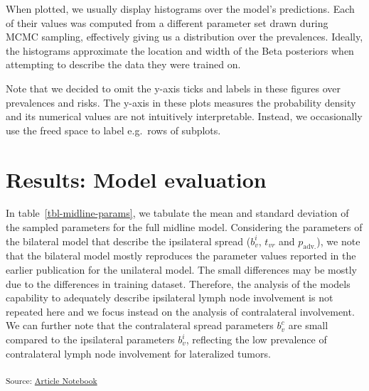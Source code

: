 \documentclass[
  sn-mathphys-num,
]{sn-jnl}
\begin{document}
When plotted, we usually display histograms over the model's
predictions. Each of their values was computed from a different
parameter set drawn during MCMC sampling, effectively giving us a
distribution over the prevalences. Ideally, the histograms approximate
the location and width of the Beta posteriors when attempting to
describe the data they were trained on.

Note that we decided to omit the y-axis ticks and labels in these
figures over prevalences and risks. The y-axis in these plots measures
the probability density and its numerical values are not intuitively
interpretable. Instead, we occasionally use the freed space to label
e.g.~rows of subplots.

\section{Results: Model evaluation}\label{sec-results}

In table~\ref{tbl-midline-params}, we tabulate the mean and standard
deviation of the sampled parameters for the full midline model.
Considering the parameters of the bilateral model that describe the
ipsilateral spread (\(b^i_v\), \(t_{vr}\) and \(p_\text{adv.}\)), we
note that the bilateral model mostly reproduces the parameter values
reported in the earlier publication \citep{ludwig_modelling_2023} for
the unilateral model. The small differences may be mostly due to the
differences in training dataset. Therefore, the analysis of the models
capability to adequately describe ipsilateral lymph node involvement is
not repeated here and we focus instead on the analysis of contralateral
involvement. We can further note that the contralateral spread
parameters \(b^c_v\) are small compared to the ipsilateral parameters
\(b^i_v\), reflecting the low prevalence of contralateral lymph node
involvement for lateralized tumors.

\textsubscript{Source:
\href{https://rmnldwg.github.io/bilateral-paper/manuscript-preview.html}{Article
Notebook}}
\end{document}
